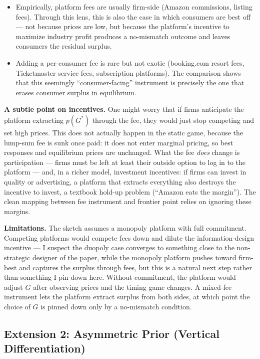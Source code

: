 \documentclass[12pt, a4paper]{article}
\begin{document}
\begin{itemize}[nosep]
    \item Empirically, platform fees are usually firm-side (Amazon commissions, listing fees). Through this lens, this is also the case in which consumers are best off --- not because prices are low, but because the platform's incentive to maximize industry profit produces a no-mismatch outcome and leaves consumers the residual surplus.
    \item Adding a per-consumer fee is rare but not exotic (booking.com resort fees, Ticketmaster service fees, subscription platforms). The comparison shows that this seemingly ``consumer-facing'' instrument is precisely the one that erases consumer surplus in equilibrium.
\end{itemize}

\textbf{A subtle point on incentives.} One might worry that if firms anticipate the platform extracting $p(G^*)$ through the fee, they would just stop competing and set high prices. This does not actually happen in the static game, because the lump-sum fee is sunk once paid: it does not enter marginal pricing, so best responses and equilibrium prices are unchanged. What the fee \emph{does} change is participation --- firms must be left at least their outside option to log in to the platform --- and, in a richer model, investment incentives: if firms can invest in quality or advertising, a platform that extracts everything also destroys the incentive to invest, a textbook hold-up problem (``Amazon eats the margin''). The clean mapping between fee instrument and frontier point relies on ignoring these margins.

\textbf{Limitations.} The sketch assumes a monopoly platform with full commitment. Competing platforms would compete fees down and dilute the information-design incentive --- I suspect the duopoly case converges to something close to the non-strategic designer of the paper, while the monopoly platform pushes toward firm-best and captures the surplus through fees, but this is a natural next step rather than something I pin down here. Without commitment, the platform would adjust $G$ after observing prices and the timing game changes. A mixed-fee instrument lets the platform extract surplus from both sides, at which point the choice of $G$ is pinned down only by a no-mismatch condition.

\subsection{Extension 2: Asymmetric Prior (Vertical Differentiation)}
\end{document}
